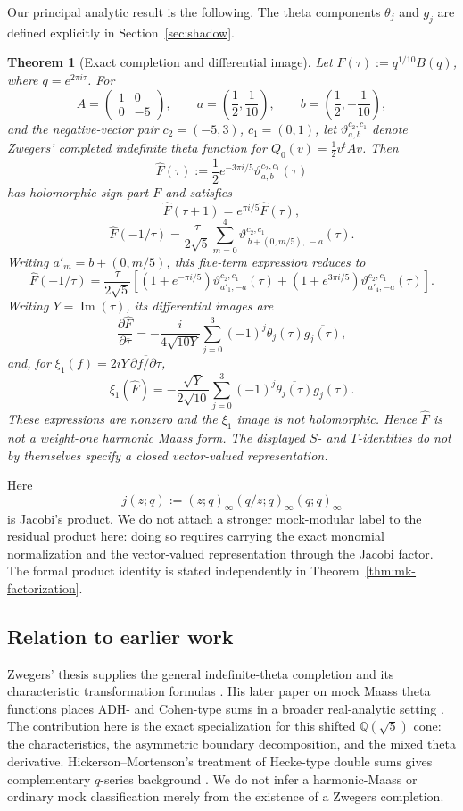 \documentclass[12pt]{amsart}
\newtheorem{theorem}{Theorem}[section]
\theoremstyle{definition}
\theoremstyle{remark}
\newcommand{\QQ}{\mathbb{Q}}
\begin{document}
Our principal analytic result is the following.  The theta components
$\theta_j$ and $g_j$ are defined explicitly in
Section~\ref{sec:shadow}.

\begin{theorem}[Exact completion and differential image]\label{thm:main}
Let $F(\tau):=q^{1/10}B(q)$, where $q=e^{2\pi i\tau}$.  For
\[
  A=\begin{pmatrix}1&0\\0&-5\end{pmatrix},\qquad
  a=\left(\frac12,\frac1{10}\right),\qquad
  b=\left(\frac12,-\frac1{10}\right),
\]
and the negative-vector pair $c_2=(-5,3)$, $c_1=(0,1)$, let
$\vartheta_{a,b}^{c_2,c_1}$ denote Zwegers' completed indefinite theta
function for $Q_0(v)=\tfrac12v^tAv$.  Then
\[
  \widehat F(\tau)
  :=\frac12e^{-3\pi i/5}\vartheta_{a,b}^{c_2,c_1}(\tau)
\]
has holomorphic sign part $F$ and satisfies
\[
  \widehat F(\tau+1)=e^{\pi i/5}\widehat F(\tau),
\]
\[
  \widehat F(-1/\tau)
  =\frac{\tau}{2\sqrt5}\sum_{m=0}^{4}
    \vartheta_{\,b+(0,m/5),\,-a}^{c_2,c_1}(\tau).
\]
Writing $a'_m=b+(0,m/5)$, this five-term expression reduces to
\[
  \widehat F(-1/\tau)
  =\frac{\tau}{2\sqrt5}\left[
    (1+e^{-\pi i/5})\vartheta_{a'_1,-a}^{c_2,c_1}(\tau)
    +(1+e^{3\pi i/5})\vartheta_{a'_4,-a}^{c_2,c_1}(\tau)
  \right].
\]
Writing $Y=\operatorname{Im}(\tau)$, its differential images are
\[
  \frac{\partial\widehat F}{\partial\overline\tau}
  =-\frac{i}{4\sqrt{10Y}}
    \sum_{j=0}^{3}(-1)^j\theta_j(\tau)\overline{g_j(\tau)},
\]
and, for $\xi_1(f)=2iY\,\overline{\partial f/\partial\overline\tau}$,
\[
  \xi_1(\widehat F)
  =-\frac{\sqrt Y}{2\sqrt{10}}
    \sum_{j=0}^{3}(-1)^j\overline{\theta_j(\tau)}g_j(\tau).
\]
These expressions are nonzero and the $\xi_1$ image is not
holomorphic.  Hence $\widehat F$ is not a weight-one harmonic Maass
form.  The displayed $S$- and $T$-identities do not by themselves
specify a closed vector-valued representation.
\end{theorem}

Here
\[
  j(z;q):=(z;q)_\infty(q/z;q)_\infty(q;q)_\infty
\]
is Jacobi's product.  We do not attach a stronger mock-modular label
to the residual product here: doing so requires carrying the exact
monomial normalization and the vector-valued representation through
the Jacobi factor.  The formal product identity is stated independently
in Theorem~\ref{thm:mk-factorization}.

\subsection*{Relation to earlier work}
Zwegers' thesis supplies the general indefinite-theta completion and
its characteristic transformation formulas \cite{oZw02}.  His later
paper on mock Maass theta functions places ADH- and Cohen-type sums in
a broader real-analytic setting \cite{jZw12}.  The contribution here is
the exact specialization for this shifted $\QQ(\sqrt5)$ cone: the
characteristics, the asymmetric boundary decomposition, and the mixed
theta derivative.  Hickerson--Mortenson's treatment of Hecke-type
double sums gives complementary $q$-series background
\cite{jHiMo14}.  We do not infer a harmonic-Maass or ordinary mock
classification merely from the existence of a Zwegers completion.
\end{document}

